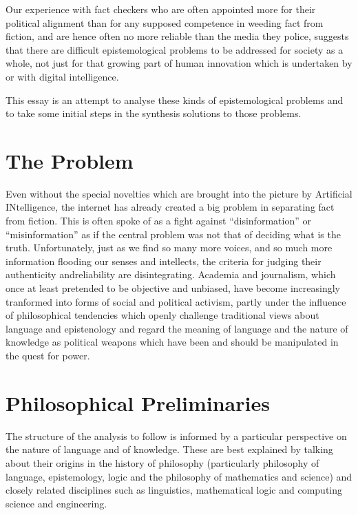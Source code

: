 \documentclass[10pt,titlepage]{book}
\begin{document}
Our experience with fact checkers who are often appointed more for their political alignment than for any supposed competence in weeding fact from fiction, and are hence often no more reliable than the media they police,  suggests that there are difficult epistemological problems to be addressed for society as a whole, not just for that growing part of human innovation which is undertaken by or with digital intelligence.


This essay is an attempt to analyse these kinds of epistemological problems and to take some initial steps in the synthesis solutions to those problems.
 
\section{The Problem}

Even without the special novelties which are brought into the picture by Artificial INtelligence, the internet has already created a big problem in separating fact from fiction.
This is often spoke of as a fight against ``disinformation'' or ``misinformation'' as if the central problem was not that of deciding what is the truth.
Unfortunately, just as we find so many more voices, and so much more information flooding our senses and intellects, the criteria for judging their authenticity andreliability are disintegrating.
Academia and journalism, which once at least pretended to be objective and unbiased, have become increasingly tranformed into forms of social and political activism, partly under the influence of philosophical tendencies which openly challenge traditional views about language and epistenology and regard the meaning of language and the nature of knowledge as political weapons which have been and should be manipulated in the quest for power.

\section{Philosophical Preliminaries}

The structure of the analysis to follow is informed by a particular perspective on the nature of language and of knowledge.
These are best explained by talking about their origins in the history of philosophy (particularly philosophy of language, epistemology, logic and the philosophy of mathematics and science) and closely related disciplines such as linguistics, mathematical logic and computing science and engineering.
\end{document}
